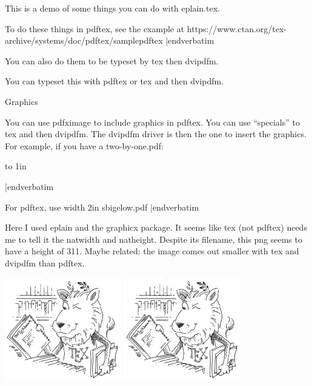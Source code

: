 
\beginpackages
  \usepackage{url}
  \usepackage{color}
  \usepackage{graphicx}
\endpackages

This is a demo of some things you can do with eplain.tex.

To do these things in pdftex, see the example at
\verbatim
https://www.ctan.org/tex-archive/systems/doc/pdftex/samplepdftex
|endverbatim

You can also do them to be typeset by tex then dvipdfm.

You can
typeset this with pdftex or tex and then dvipdfm.

\beginsection Graphics

You can use pdfximage to include graphics in pdftex.  You can use
``specials'' to tex and then dvipdfm.  The dvipdfm driver is then
the one to insert the graphics.  For example,
if you have a two-by-one.pdf:

\verbatim
\vbox to 1in{\vss {}}
|endverbatim

For pdftex, use
\verbatim
\pdfximage width 2in {sbigelow.pdf} \pdfrefximage\pdflastximage
|endverbatim

Here I used eplain and the graphicx package.  It seems like tex (not
pdftex) needs me to tell it the natwidth and natheight.  Despite its
filename, this png seems to have a height of 311.  Maybe related: the
image comes out smaller with tex and dvipdfm than pdftex.

\ifpdf
\includegraphics[width=2in]{ctan_lion_350x350}
\else
\includegraphics[width=2in,natwidth=350,natheight=311]{ctan_lion_350x350.png}
\fi

